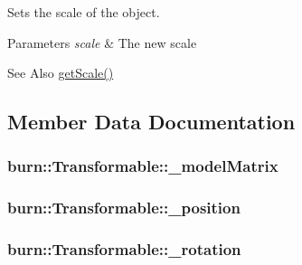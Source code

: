 Sets the scale of the object. 


\begin{DoxyParams}{Parameters}
{\em scale} & The new scale\\
\hline
\end{DoxyParams}
\begin{DoxySeeAlso}{See Also}
\hyperlink{classburn_1_1_transformable_a7e6d9642bcb49deb83b38a3831824b52}{get\-Scale()} 
\end{DoxySeeAlso}


\subsection{Member Data Documentation}
\hypertarget{classburn_1_1_transformable_a6a06bcec86a7f2e70eba6fe7e8bbe61c}{
\subsubsection[{\-\_\-model\-Matrix}]{ burn\-::\-Transformable\-::\-\_\-model\-Matrix\hspace{0.3cm}{\ttfamily [protected]}}}\label{classburn_1_1_transformable_a6a06bcec86a7f2e70eba6fe7e8bbe61c}
\hypertarget{classburn_1_1_transformable_a1cb1a52f8518c7c2f50e45d8cd902767}{
\subsubsection[{\-\_\-position}]{ burn\-::\-Transformable\-::\-\_\-position\hspace{0.3cm}{\ttfamily [protected]}}}\label{classburn_1_1_transformable_a1cb1a52f8518c7c2f50e45d8cd902767}
\hypertarget{classburn_1_1_transformable_ad62e417f44d78cbeedfd30e62c1b896d}{
\subsubsection[{\-\_\-rotation}]{ burn\-::\-Transformable\-::\-\_\-rotation\hspace{0.3cm}{\ttfamily [protected]}}}\label{classburn_1_1_transformable_ad62e417f44d78cbeedfd30e62c1b896d}
